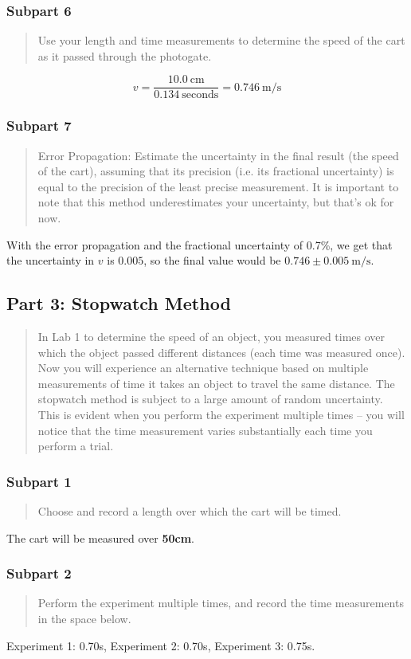\documentclass[8pt]{extarticle}
\newcommand{\plain}[1]{\textrm{#1}}
\begin{document}
{\subsubsection*{Subpart 6}
\begin{quote}
	Use your length and time measurements to determine the speed of the cart as it passed through the photogate.
\end{quote}
\[ v = \frac{10.0~\plain{cm}}{0.134~\plain{seconds}} = 0.746~\plain{m/s} \]
\subsubsection*{Subpart 7}
\begin{quote}
	 Error Propagation: Estimate the uncertainty in the final result (the speed of the cart), assuming that its precision (i.e. its fractional uncertainty) is equal to the precision of the least precise measurement. It is important to note that this method underestimates your uncertainty, but that’s ok for now.
\end{quote}
With the error propagation and the fractional uncertainty of 0.7\%, we get that the uncertainty in $v$ is $0.005$, so the final value would be $0.746\pm 0.005~\plain{m/s}$.
\subsection*{Part 3: Stopwatch Method}
\begin{quote}
	In Lab 1 to determine the speed of an object, you measured times over which the object passed different distances (each time was measured once). Now you will experience an alternative technique based on multiple measurements of time it takes an object to travel the same distance. The stopwatch method is subject to a large amount of random uncertainty. This is evident when you perform the experiment multiple times – you will notice that the time measurement varies substantially each time you perform a trial.
\end{quote}
\subsubsection*{Subpart 1}
\begin{quote}
	Choose and record a length over which the cart will be timed.
\end{quote}
The cart will be measured over \textbf{50cm}.
\subsubsection*{Subpart 2}
\begin{quote}
	Perform the experiment multiple times, and record the time measurements in the space below.
\end{quote}
Experiment 1: 0.70s, Experiment 2: 0.70s, Experiment 3: 0.75s.
}
\end{document}
